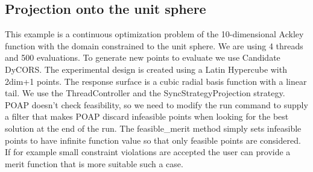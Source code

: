 \documentclass[]{article}
\begin{document}
\subsection{Projection onto the unit sphere}
This example is a continuous optimization problem of the 10-dimensional Ackley function with the domain constrained to the unit sphere. We are using 4 threads and 500 evaluations. To generate new points to evaluate we use Candidate DyCORS. The experimental design is created using a Latin Hypercube with 2dim+1 points. The response surface is a cubic radial basis function with a linear tail. We use the ThreadController and the SyncStrategyProjection strategy. POAP doesn't check feasibility, so we need to modify the run command to supply a filter that makes POAP discard infeasible points when looking for the best solution at the end of the run. The feasible\_merit method simply sets infeasible points to have infinite function value so that only feasible points are considered. If for example small constraint violations are accepted the user can provide a merit function that is more suitable such a case.
\end{document}
